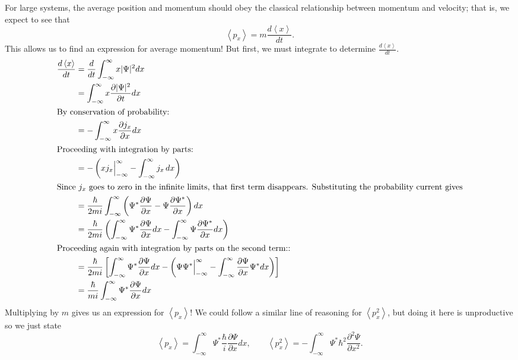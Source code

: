 \documentclass[../p052main.tex]{subfiles}
\begin{document}
For large systems, the average position and momentum should obey the classical relationship between momentum and velocity; that is, we expect to see that
\[ \left< p_x \right> = m \frac{d \left< x \right>}{dt}. \]
This allows us to find an expression for average momentum!
But first, we must integrate to determine $\frac{d \left< x \right>}{dt}$.
\begin{align*}
    \frac{d\left< x \right>}{dt} &= \frac{d}{dt} \int_{-\infty}^{\infty} x |\Psi|^2 dx \\
    &= \int_{-\infty}^{\infty} x \frac{\partial |\Psi|^2}{\partial t}dx \\
    \intertext{By conservation of probability:}
    &= -\int_{-\infty}^{\infty} x \frac{\partial j_x}{\partial x} dx \\
    \intertext{Proceeding with integration by parts:}
    &= -\left( x j_x \Big|_{-\infty}^\infty - \int_{-\infty}^{\infty} j_x \,dx \right) \\
    \intertext{Since $j_x$ goes to zero in the infinite limits, that first term disappears. Substituting the probability current gives}
    &= \frac{\hbar}{2mi} \int_{-\infty}^{\infty} \left( \Psi^* \frac{\partial \Psi}{\partial x} - \Psi \frac{\partial \Psi^*}{\partial x} \right) dx \\
    &= \frac{\hbar}{2mi} \left( \int_{-\infty}^{\infty} \Psi^* \frac{\partial \Psi}{\partial x} dx - \int_{-\infty}^{\infty} \Psi \frac{\partial \Psi^*}{\partial x} dx \right) \\
    \intertext{Proceeding again with integration by parts on the second term::}
    &= \frac{\hbar}{2mi} \left[ \int_{-\infty}^{\infty} \Psi^* \frac{\partial \Psi}{\partial x} dx - \left( \Psi \Psi^* \Big|_{-\infty}^\infty - \int_{-\infty}^{\infty} \frac{\partial \Psi}{\partial x} \Psi^* dx \right) \right] \\
    &= \frac{\hbar}{mi} \int_{-\infty}^\infty \Psi^* \frac{\partial \Psi}{\partial x} dx
\end{align*}
Multiplying by $m$ gives us an expression for $\left< p_x \right>$!
We could follow a similar line of reasoning for $\left< p_x^2 \right>$, but doing it here is unproductive so we just state
\[ \left< p_x \right> = \int_{-\infty}^\infty \Psi^* \frac{\hbar}{i} \frac{\partial \Psi}{\partial x} dx, \qquad \left< p_x^2 \right> = -\int_{-\infty}^\infty \Psi^* \hbar^2 \frac{\partial^2 \Psi}{\partial x^2}. \]
\end{document}
